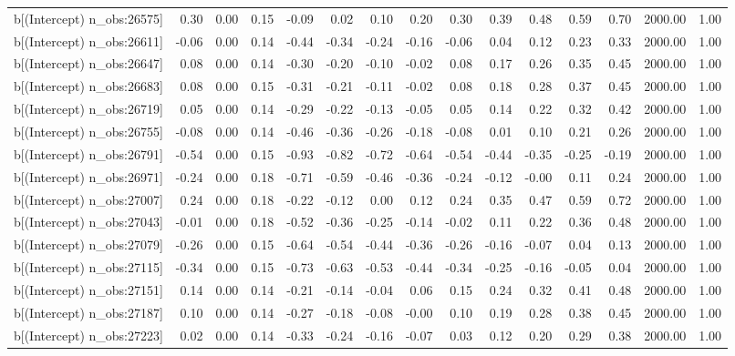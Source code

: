 \begin{table}[ht]
\begin{tabular}{rrrrrrrrrrrrrrr}
  b[(Intercept) n\_obs:26575] & 0.30 & 0.00 & 0.15 & -0.09 & 0.02 & 0.10 & 0.20 & 0.30 & 0.39 & 0.48 & 0.59 & 0.70 & 2000.00 & 1.00 \\ 
  b[(Intercept) n\_obs:26611] & -0.06 & 0.00 & 0.14 & -0.44 & -0.34 & -0.24 & -0.16 & -0.06 & 0.04 & 0.12 & 0.23 & 0.33 & 2000.00 & 1.00 \\ 
  b[(Intercept) n\_obs:26647] & 0.08 & 0.00 & 0.14 & -0.30 & -0.20 & -0.10 & -0.02 & 0.08 & 0.17 & 0.26 & 0.35 & 0.45 & 2000.00 & 1.00 \\ 
  b[(Intercept) n\_obs:26683] & 0.08 & 0.00 & 0.15 & -0.31 & -0.21 & -0.11 & -0.02 & 0.08 & 0.18 & 0.28 & 0.37 & 0.45 & 2000.00 & 1.00 \\ 
  b[(Intercept) n\_obs:26719] & 0.05 & 0.00 & 0.14 & -0.29 & -0.22 & -0.13 & -0.05 & 0.05 & 0.14 & 0.22 & 0.32 & 0.42 & 2000.00 & 1.00 \\ 
  b[(Intercept) n\_obs:26755] & -0.08 & 0.00 & 0.14 & -0.46 & -0.36 & -0.26 & -0.18 & -0.08 & 0.01 & 0.10 & 0.21 & 0.26 & 2000.00 & 1.00 \\ 
  b[(Intercept) n\_obs:26791] & -0.54 & 0.00 & 0.15 & -0.93 & -0.82 & -0.72 & -0.64 & -0.54 & -0.44 & -0.35 & -0.25 & -0.19 & 2000.00 & 1.00 \\ 
  b[(Intercept) n\_obs:26971] & -0.24 & 0.00 & 0.18 & -0.71 & -0.59 & -0.46 & -0.36 & -0.24 & -0.12 & -0.00 & 0.11 & 0.24 & 2000.00 & 1.00 \\ 
  b[(Intercept) n\_obs:27007] & 0.24 & 0.00 & 0.18 & -0.22 & -0.12 & 0.00 & 0.12 & 0.24 & 0.35 & 0.47 & 0.59 & 0.72 & 2000.00 & 1.00 \\ 
  b[(Intercept) n\_obs:27043] & -0.01 & 0.00 & 0.18 & -0.52 & -0.36 & -0.25 & -0.14 & -0.02 & 0.11 & 0.22 & 0.36 & 0.48 & 2000.00 & 1.00 \\ 
  b[(Intercept) n\_obs:27079] & -0.26 & 0.00 & 0.15 & -0.64 & -0.54 & -0.44 & -0.36 & -0.26 & -0.16 & -0.07 & 0.04 & 0.13 & 2000.00 & 1.00 \\ 
  b[(Intercept) n\_obs:27115] & -0.34 & 0.00 & 0.15 & -0.73 & -0.63 & -0.53 & -0.44 & -0.34 & -0.25 & -0.16 & -0.05 & 0.04 & 2000.00 & 1.00 \\ 
  b[(Intercept) n\_obs:27151] & 0.14 & 0.00 & 0.14 & -0.21 & -0.14 & -0.04 & 0.06 & 0.15 & 0.24 & 0.32 & 0.41 & 0.48 & 2000.00 & 1.00 \\ 
  b[(Intercept) n\_obs:27187] & 0.10 & 0.00 & 0.14 & -0.27 & -0.18 & -0.08 & -0.00 & 0.10 & 0.19 & 0.28 & 0.38 & 0.45 & 2000.00 & 1.00 \\ 
  b[(Intercept) n\_obs:27223] & 0.02 & 0.00 & 0.14 & -0.33 & -0.24 & -0.16 & -0.07 & 0.03 & 0.12 & 0.20 & 0.29 & 0.38 & 2000.00 & 1.00 \\ 

\end{tabular}
\end{table}
